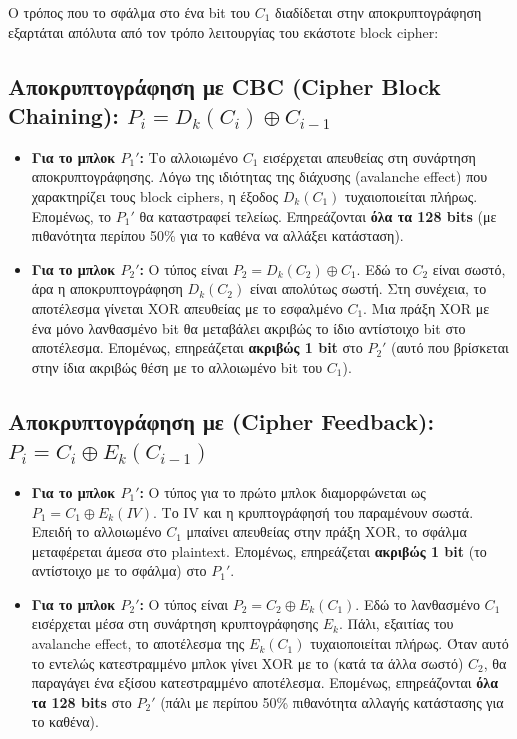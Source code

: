 \documentclass[12pt, a4paper]{article}
\begin{document}
Ο τρόπος που το σφάλμα στο ένα bit του $C_1$ διαδίδεται στην αποκρυπτογράφηση εξαρτάται απόλυτα από τον τρόπο λειτουργίας του εκάστοτε block cipher:

\subsection*{Αποκρυπτογράφηση με CBC (Cipher Block Chaining): $P_i = D_k(C_i) \oplus C_{i-1}$}

\begin{itemize}
    \item \textbf{Για το μπλοκ $P_1'$:} Το αλλοιωμένο $C_1$ εισέρχεται απευθείας στη συνάρτηση αποκρυπτογράφησης. Λόγω της ιδιότητας της διάχυσης (avalanche effect) που χαρακτηρίζει τους block ciphers, η έξοδος $D_k(C_1)$ τυχαιοποιείται πλήρως. Επομένως, το $P_1'$ θα καταστραφεί τελείως. Επηρεάζονται \textbf{όλα τα 128 bits} (με πιθανότητα περίπου 50\% για το καθένα να αλλάξει κατάσταση).
    \item \textbf{Για το μπλοκ $P_2'$:} Ο τύπος είναι $P_2 = D_k(C_2) \oplus C_1$. Εδώ το $C_2$ είναι σωστό, άρα η αποκρυπτογράφηση $D_k(C_2)$ είναι απολύτως σωστή. Στη συνέχεια, το αποτέλεσμα γίνεται XOR απευθείας με το εσφαλμένο $C_1$. Μια πράξη XOR με ένα μόνο λανθασμένο bit θα μεταβάλει ακριβώς το ίδιο αντίστοιχο bit στο αποτέλεσμα. Επομένως, επηρεάζεται \textbf{ακριβώς 1 bit} στο $P_2'$ (αυτό που βρίσκεται στην ίδια ακριβώς θέση με το αλλοιωμένο bit του $C_1$).
\end{itemize}

\subsection*{Αποκρυπτογράφηση με (Cipher Feedback): $P_i = C_i \oplus E_k(C_{i-1})$}

\begin{itemize}
    \item \textbf{Για το μπλοκ $P_1'$:} Ο τύπος για το πρώτο μπλοκ διαμορφώνεται ως $P_1 = C_1 \oplus E_k(IV)$. Το IV και η κρυπτογράφησή του παραμένουν σωστά. Επειδή το αλλοιωμένο $C_1$ μπαίνει απευθείας στην πράξη XOR, το σφάλμα μεταφέρεται άμεσα στο plaintext. Επομένως, επηρεάζεται \textbf{ακριβώς 1 bit} (το αντίστοιχο με το σφάλμα) στο $P_1'$.
    \item \textbf{Για το μπλοκ $P_2'$:} Ο τύπος είναι $P_2 = C_2 \oplus E_k(C_1)$. Εδώ το λανθασμένο $C_1$ εισέρχεται μέσα στη συνάρτηση κρυπτογράφησης $E_k$. Πάλι, εξαιτίας του avalanche effect, το αποτέλεσμα της $E_k(C_1)$ τυχαιοποιείται πλήρως. Όταν αυτό το εντελώς κατεστραμμένο μπλοκ γίνει XOR με το (κατά τα άλλα σωστό) $C_2$, θα παραγάγει ένα εξίσου κατεστραμμένο αποτέλεσμα. Επομένως, επηρεάζονται \textbf{όλα τα 128 bits} στο $P_2'$ (πάλι με περίπου 50\% πιθανότητα αλλαγής κατάστασης για το καθένα).
\end{itemize}
\end{document}
